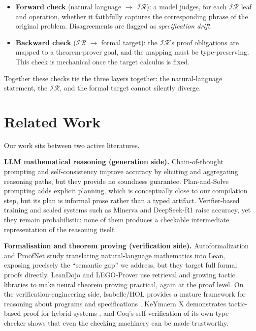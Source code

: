 \documentclass[11pt]{article}
\newcommand{\IR}{\ensuremath{\mathcal{IR}}}
\begin{document}
\begin{itemize}
\item \textbf{Forward check} (natural language $\rightarrow$ \IR{}): a model
judges, for each \IR{} leaf and operation, whether it faithfully captures the
corresponding phrase of the original problem. Disagreements are flagged as
\emph{specification drift}.
\item \textbf{Backward check} (\IR{} $\rightarrow$ formal target): the \IR{}'s
proof obligations are mapped to a theorem-prover goal, and the mapping must be
type-preserving. This check is mechanical once the target calculus is fixed.
\end{itemize}

Together these checks tie the three layers together: the natural-language
statement, the \IR{}, and the formal target cannot silently diverge.
\section{Related Work}
\label{sec:related}

Our work sits between two active literatures.

\textbf{LLM mathematical reasoning (generation side).} Chain-of-thought
prompting \citep{wei2022chain} and self-consistency
\citep{wang2022selfconsistency} improve accuracy by eliciting and aggregating
reasoning paths, but they provide no soundness guarantee. Plan-and-Solve
prompting \citep{wang2023plan} adds explicit planning, which is conceptually
close to our compilation step, but its plan is informal prose rather than a
typed artifact. Verifier-based training \citep{cobbe2021training} and scaled
systems such as Minerva \citep{lewkowycz2022solving} and DeepSeek-R1
\citep{deepseek2025r1} raise accuracy, yet they remain probabilistic: none of
them produces a checkable intermediate representation of the reasoning itself.

\textbf{Formalisation and theorem proving (verification side).}
Autoformalization \citep{wu2022autoformalization} and ProofNet
\citep{azerbayev2023proofnet} study translating natural-language mathematics
into Lean, exposing precisely the ``semantic gap'' we address, but they target
full formal proofs directly. LeanDojo \citep{yang2023leandojo} and LEGO-Prover
\citep{wang2023legoprover} use retrieval and growing tactic libraries to make
neural theorem proving practical, again at the proof level. On the
verification-engineering side, Isabelle/HOL provides a mature framework for
reasoning about programs and specifications \citep{schirmer2006verification},
KeYmaera X demonstrates tactic-based proof for hybrid systems
\citep{fulton2015keymaera}, and Coq's self-verification of its own type checker
\citep{sozeau2019coqcoqcorrect} shows that even the checking machinery can be
made trustworthy.
\end{document}
